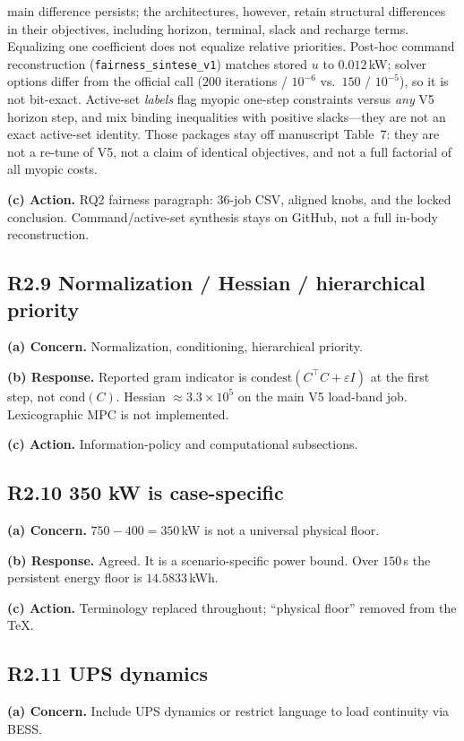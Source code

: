 \documentclass[11pt]{article}
\begin{document}
main difference persists; the architectures, however, retain structural differences in their objectives, including horizon, terminal, slack and recharge terms. Equalizing one coefficient does not equalize relative priorities. Post-hoc command reconstruction (\texttt{fairness\_sintese\_v1}) matches stored $u$ to $0.012$\,kW; solver options differ from the official call ($200$ iterations / $10^{-6}$ vs.\ $150$ / $10^{-5}$), so it is not bit-exact. Active-set \emph{labels} flag myopic one-step constraints versus \emph{any} V5 horizon step, and mix binding inequalities with positive slacks---they are not an exact active-set identity. Those packages stay off manuscript Table~7: they are not a re-tune of V5, not a claim of identical objectives, and not a full factorial of all myopic costs.

\textbf{(c) Action.} RQ2 fairness paragraph: 36-job CSV, aligned knobs, and the locked conclusion. Command/active-set synthesis stays on GitHub, not a full in-body reconstruction.

\subsection*{R2.9 Normalization / Hessian / hierarchical priority}
\textbf{(a) Concern.} Normalization, conditioning, hierarchical priority.

\textbf{(b) Response.} Reported gram indicator is $\mathrm{condest}(C^\top C+\varepsilon I)$ at the first step, not $\mathrm{cond}(C)$. Hessian $\approx 3.3\times 10^{5}$ on the main V5 load-band job. Lexicographic MPC is not implemented.

\textbf{(c) Action.} Information-policy and computational subsections.

\subsection*{R2.10 350 kW is case-specific}
\textbf{(a) Concern.} $750-400=350$\,kW is not a universal physical floor.

\textbf{(b) Response.} Agreed. It is a scenario-specific power bound. Over $150$\,s the persistent energy floor is $14.5833$\,kWh.

\textbf{(c) Action.} Terminology replaced throughout; ``physical floor'' removed from the TeX.

\subsection*{R2.11 UPS dynamics}
\textbf{(a) Concern.} Include UPS dynamics or restrict language to load continuity via BESS.
\end{document}
